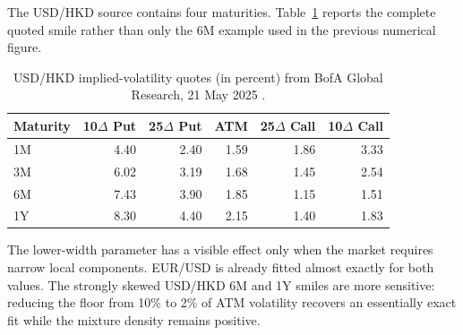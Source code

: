 \documentclass[11pt]{article}
\begin{document}
The USD/HKD source contains four maturities. Table~\ref{tab:hkdquotes} reports the complete quoted smile rather than only the 6M example used in the previous numerical figure.

\begin{table}[H]
\centering
\caption{USD/HKD implied-volatility quotes (in percent) from BofA Global Research, 21 May 2025 \cite{bofa2025}.}
\label{tab:hkdquotes}
\small
\begin{tabular}{lrrrrr}
\toprule
Maturity & 10$\Delta$ Put & 25$\Delta$ Put & ATM & 25$\Delta$ Call & 10$\Delta$ Call \\
\midrule
1M & 4.40 & 2.40 & 1.59 & 1.86 & 3.33 \\
3M & 6.02 & 3.19 & 1.68 & 1.45 & 2.54 \\
6M & 7.43 & 3.90 & 1.85 & 1.15 & 1.51 \\
1Y & 8.30 & 4.40 & 2.15 & 1.40 & 1.83 \\
\bottomrule
\end{tabular}
\end{table}

The lower-width parameter has a visible effect only when the market requires narrow local components. EUR/USD is already fitted almost exactly for both values. The strongly skewed USD/HKD 6M and 1Y smiles are more sensitive: reducing the floor from 10\% to 2\% of ATM volatility recovers an essentially exact fit while the mixture density remains positive.

\begin{table}[H]
\centering
\caption{Flat-kernel FX calibration diagnostics for $\eta=10\%$ and $\eta=2\%$. No wing control is used.}
\label{tab:fx}
\small
{}
\end{table}
\end{document}
